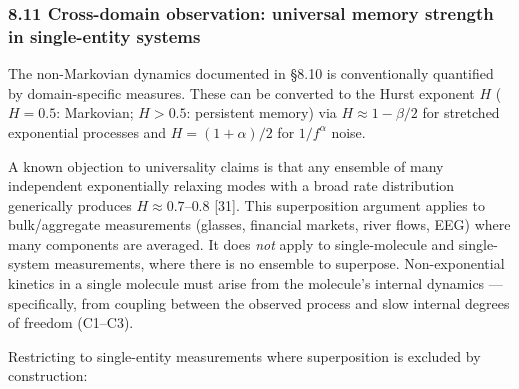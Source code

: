 \documentclass[
]{article}
\begin{document}
\hypertarget{cross-domain-observation-universal-memory-strength-in-single-entity-systems}{%
\subsubsection{8.11 Cross-domain observation: universal memory strength
in single-entity
systems}\label{cross-domain-observation-universal-memory-strength-in-single-entity-systems}}

The non-Markovian dynamics documented in §8.10 is conventionally
quantified by domain-specific measures. These can be converted to the
Hurst exponent \(H\) (\(H = 0.5\): Markovian; \(H > 0.5\): persistent
memory) via \(H \approx 1 - \beta/2\) for stretched exponential
processes and \(H = (1 + \alpha)/2\) for \(1/f^\alpha\) noise.

A known objection to universality claims is that any ensemble of many
independent exponentially relaxing modes with a broad rate distribution
generically produces \(H \approx 0.7\)--\(0.8\) {[}31{]}. This
superposition argument applies to bulk/aggregate measurements (glasses,
financial markets, river flows, EEG) where many components are averaged.
It does \emph{not} apply to single-molecule and single-system
measurements, where there is no ensemble to superpose. Non-exponential
kinetics in a single molecule must arise from the molecule's internal
dynamics --- specifically, from coupling between the observed process
and slow internal degrees of freedom (C1--C3).

Restricting to single-entity measurements where superposition is
excluded by construction:
\end{document}
